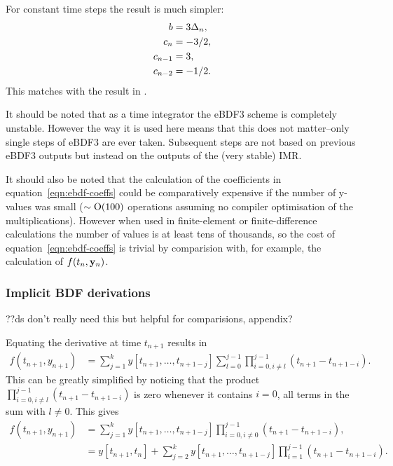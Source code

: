 For constant time steps the result is much simpler:
\begin{equation}
  \begin{aligned}
    b &= 3\Delta_{n},\\ 
    c_n &= -3/2,\\
    c_{n-1} & = 3,\\
    c_{n-2} &= -1/2.
  \end{aligned}
\end{equation} 
This matches with the result in \cite[pg. 364]{HairerNorsettWanner}.

It should be noted that as a time integrator the eBDF3 scheme is completely unstable.
However the way it is used here means that this does not matter--only single steps of eBDF3 are ever taken.
Subsequent steps are not based on previous eBDF3 outputs but instead on the outputs of the (very stable) IMR.

It should also be noted that the calculation of the coefficients in equation~\eqref{eqn:ebdf-coeffs} could be comparatively expensive if the number of y-values was small ($\sim \text{O}(100)$ operations assuming no compiler optimisation of the multiplications).
However when used in finite-element or finite-difference calculations the number of values is at least tens of thousands, so the cost of equation~\eqref{eqn:ebdf-coeffs} is trivial by comparision with, for example, the calculation of $f(t_n, \mathbf{y}_n)$.


\subsubsection{Implicit BDF derivations}
??ds don't really need this but helpful for comparisions, appendix?

Equating the derivative at time $t_{n+1}$ results in
\begin{equation}
  \begin{aligned}
    f(t_{n+1}, y_{n+1}) &= \sum_{j=1}^k y[t_{n+1}, \ldots, t_{n+1-j}] \sum_{l=0}^{j-1} \prod_{i=0, i \neq l}^{j-1} (t_{n+1} - t_{n+1-i}).
  \end{aligned}
\end{equation} 
This can be greatly simplified by noticing that the product $ \prod_{i=0, i \neq l}^{j-1} (t_{n+1} - t_{n+1-i})$ is zero whenever it contains $i=0$, \ie all terms in the sum with $l \neq 0$.
This gives
\begin{equation}
  \begin{aligned}
    f(t_{n+1}, y_{n+1}) &= \sum_{j=1}^k y[t_{n+1}, \ldots, t_{n+1-j}] \prod_{i=0, i \neq 0}^{j-1} (t_{n+1} - t_{n+1-i}), \\
    &=  y[t_{n+1}, t_n] + \sum_{j=2}^k y[t_{n+1}, \ldots, t_{n+1-j}] \prod_{i=1}^{j-1} (t_{n+1} - t_{n+1-i}). \\
  \end{aligned}
\end{equation}

